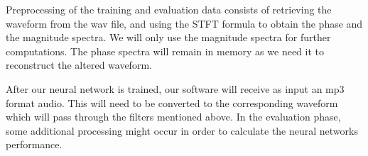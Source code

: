 \documentclass[../Thesis.tex]{subfiles}
\begin{document}
Preprocessing of the training and evaluation data consists of retrieving the waveform from the wav file, and using the STFT formula to obtain the phase and the magnitude spectra. We will only use the magnitude spectra for further computations. The phase spectra will remain in memory as we need it to reconstruct the altered waveform.

After our neural network is trained, our software will receive as input an mp3 format audio. This will need to be converted to the corresponding waveform which will pass through the filters mentioned above. In the evaluation phase, some additional processing might occur in order to calculate the neural networks performance.
\end{document}
